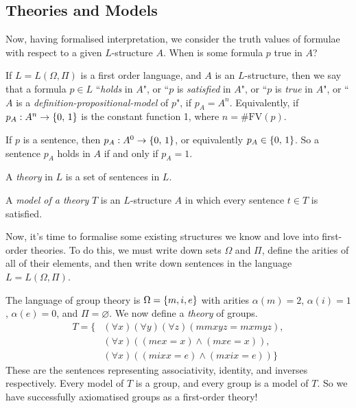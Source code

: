 \documentclass{article}
\begin{document}

\subsection{Theories and Models}
\label{section-first-order-theories}

Now, having formalised interpretation, we consider the truth values of formulae with respect to a given $L$-structure $A$. When is some formula $p$ true in $A$?

\begin{definition}[Model]
	\label{first-order-predicate-model}
    If $L = L(\Omega, \Pi)$ is a first order language, and $A$ is an $L$-structure, then we say that a formula $p \in L$ ``\textit{holds} in $A$", or ``$p$ is \textit{satisfied} in $A$", or ``$p$ is \textit{true} in $A$", or ``$A$ is a \textit{definition-propositional-model} of $p$", if $p_A = A^n$. Equivalently, if $p_A : A^n \to \left\lbrace 0, \, 1 \right\rbrace$ is the constant function 1, where $n = \# \mathrm{FV}(p)$.
\end{definition}

\begin{corollary}
	If $p$ is a sentence, then $p_A : A^0 \to \left\lbrace 0, \, 1 \right\rbrace$, or equivalently $p_A \in \left\lbrace 0, \, 1 \right\rbrace$. So a sentence $p_A$ holds in $A$ if and only if $p_A = 1$.
\end{corollary}

\begin{definition}[Theory]
    A \textit{theory} in $L$ is a set of sentences in $L$.
    
    A \textit{model of a theory} $T$ is an $L$-structure $A$ in which every sentence $t \in T$ is satisfied.
\end{definition}

Now, it's time to formalise some existing structures we know and love into first-order theories. To do this, we must write down sets $\Omega$ and $\Pi$, define the arities of all of their elements, and then write down sentences in the language $L = L(\Omega, \Pi)$.


\begin{example}
    The language of group theory is $\Omega = \left\lbrace m, i, e \right\rbrace$ with arities $\alpha(m) = 2$, $\alpha(i) = 1$, $\alpha(e) = 0$, and $\Pi = \varnothing$. We now define  a \textit{theory} of groups.
    \begin{align*}
    	T = \{ &(\forall x)(\forall y)(\forall z)(mmxyz = mxmyz), \\
    	&(\forall x)((mex = x) \land (mxe = x)), \\
    	&(\forall x)((mixx = e) \land (mxix = e)) \}
	\end{align*}
	These are the sentences representing associativity, identity, and inverses respectively. Every model of $T$ is a group, and every group is a model of $T$. So we have successfully axiomatised groups as a first-order theory!
\end{example}
\end{document}
